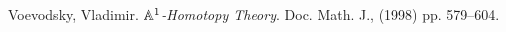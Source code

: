 \documentclass{amsart}%
\begin{document}
\begin{thebibliography}{OOOO}




     Voevodsky, Vladimir. {\it $\mathbb{A}^1$-Homotopy
    Theory}. Doc. Math. J., (1998) pp. 579--604.

\end{thebibliography}
\end{document}
